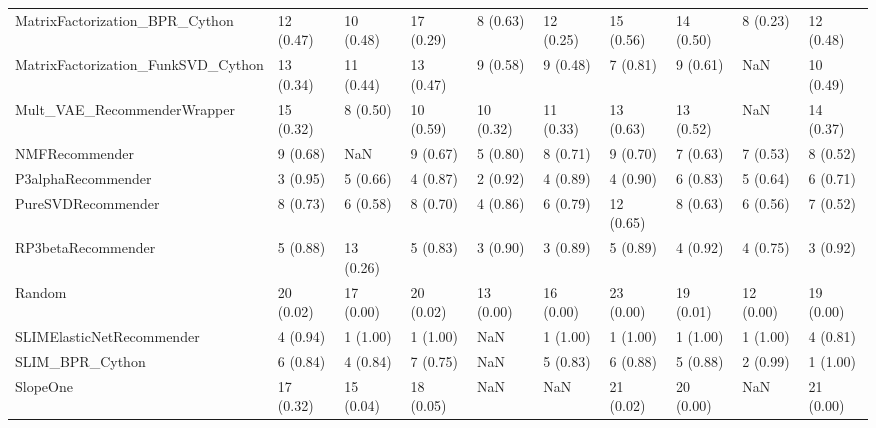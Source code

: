 \begin{tabular}{llllllllll}
     MatrixFactorization\_BPR\_Cython &                12 (0.47) &   10 (0.48) &     17 (0.29) &     8 (0.63) &            12 (0.25) &           15 (0.56) &         14 (0.50) &           8 (0.23) &         12 (0.48) \\
 MatrixFactorization\_FunkSVD\_Cython &                13 (0.34) &   11 (0.44) &     13 (0.47) &     9 (0.58) &             9 (0.48) &            7 (0.81) &          9 (0.61) &                NaN &         10 (0.49) \\
        Mult\_VAE\_RecommenderWrapper &                15 (0.32) &    8 (0.50) &     10 (0.59) &    10 (0.32) &            11 (0.33) &           13 (0.63) &         13 (0.52) &                NaN &         14 (0.37) \\
                     NMFRecommender &                 9 (0.68) &         NaN &      9 (0.67) &     5 (0.80) &             8 (0.71) &            9 (0.70) &          7 (0.63) &           7 (0.53) &          8 (0.52) \\
                 P3alphaRecommender &                 3 (0.95) &    5 (0.66) &      4 (0.87) &     2 (0.92) &             4 (0.89) &            4 (0.90) &          6 (0.83) &           5 (0.64) &          6 (0.71) \\
                 PureSVDRecommender &                 8 (0.73) &    6 (0.58) &      8 (0.70) &     4 (0.86) &             6 (0.79) &           12 (0.65) &          8 (0.63) &           6 (0.56) &          7 (0.52) \\
                 RP3betaRecommender &                 5 (0.88) &   13 (0.26) &      5 (0.83) &     3 (0.90) &             3 (0.89) &            5 (0.89) &          4 (0.92) &           4 (0.75) &          3 (0.92) \\
                             Random &                20 (0.02) &   17 (0.00) &     20 (0.02) &    13 (0.00) &            16 (0.00) &           23 (0.00) &         19 (0.01) &          12 (0.00) &         19 (0.00) \\
          SLIMElasticNetRecommender &                 4 (0.94) &    1 (1.00) &      1 (1.00) &          NaN &             1 (1.00) &            1 (1.00) &          1 (1.00) &           1 (1.00) &          4 (0.81) \\
                    SLIM\_BPR\_Cython &                 6 (0.84) &    4 (0.84) &      7 (0.75) &          NaN &             5 (0.83) &            6 (0.88) &          5 (0.88) &           2 (0.99) &          1 (1.00) \\
                           SlopeOne &                17 (0.32) &   15 (0.04) &     18 (0.05) &          NaN &                  NaN &           21 (0.02) &         20 (0.00) &                NaN &         21 (0.00) \\

\end{tabular}
